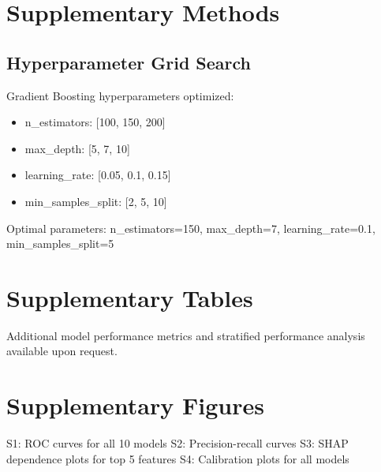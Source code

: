 \documentclass[11pt,a4paper]{article}
\begin{document}
\section{Supplementary Methods}

\subsection{Hyperparameter Grid Search}

Gradient Boosting hyperparameters optimized:
\begin{itemize}
    \item n\_estimators: [100, 150, 200]
    \item max\_depth: [5, 7, 10]
    \item learning\_rate: [0.05, 0.1, 0.15]
    \item min\_samples\_split: [2, 5, 10]
\end{itemize}

Optimal parameters: n\_estimators=150, max\_depth=7, learning\_rate=0.1, min\_samples\_split=5

\section{Supplementary Tables}

Additional model performance metrics and stratified performance analysis available upon request.

\section{Supplementary Figures}

S1: ROC curves for all 10 models  
S2: Precision-recall curves  
S3: SHAP dependence plots for top 5 features  
S4: Calibration plots for all models  

\end{document}
